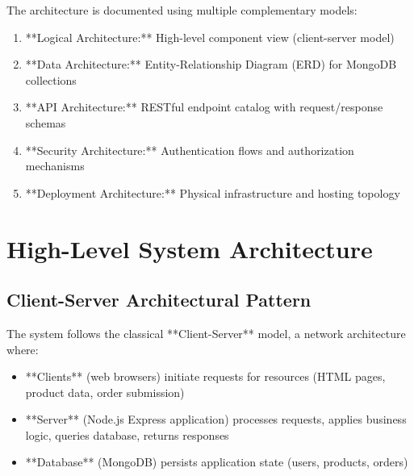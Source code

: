 \documentclass[12pt, a4paper]{report}
\begin{document}
The architecture is documented using multiple complementary models:
\begin{enumerate}
    \item **Logical Architecture:** High-level component view (client-server model)
    \item **Data Architecture:** Entity-Relationship Diagram (ERD) for MongoDB collections
    \item **API Architecture:** RESTful endpoint catalog with request/response schemas
    \item **Security Architecture:** Authentication flows and authorization mechanisms
    \item **Deployment Architecture:** Physical infrastructure and hosting topology
\end{enumerate}

\section{High-Level System Architecture}

\subsection{Client-Server Architectural Pattern}

The system follows the classical **Client-Server** model, a network architecture where:
\begin{itemize}
    \item **Clients** (web browsers) initiate requests for resources (HTML pages, product data, order submission)
    \item **Server** (Node.js Express application) processes requests, applies business logic, queries database, returns responses
    \item **Database** (MongoDB) persists application state (users, products, orders)
\end{itemize}
\end{document}
